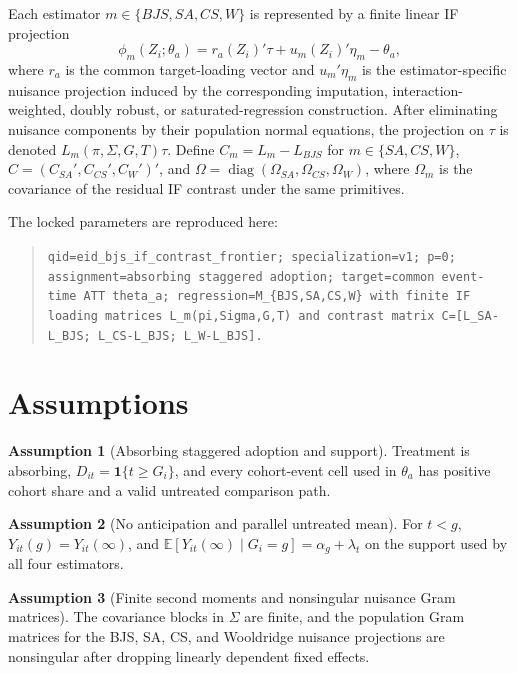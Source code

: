 \documentclass[11pt]{article}
\newcommand{\E}{\mathbb{E}}
\newcommand{\one}{\mathbf{1}}
\theoremstyle{definition}
\newtheorem{assumption}{Assumption}
\theoremstyle{plain}
\theoremstyle{remark}
\begin{document}
Each estimator $m\in\{BJS,SA,CS,W\}$ is represented by a finite linear IF projection
\[
\phi_m(Z_i;\theta_a)= r_a(Z_i)'\tau + u_m(Z_i)'\eta_m - \theta_a,
\]
where $r_a$ is the common target-loading vector and $u_m'\eta_m$ is the estimator-specific nuisance projection induced by the corresponding imputation, interaction-weighted, doubly robust, or saturated-regression construction. After eliminating nuisance components by their population normal equations, the projection on $\tau$ is denoted $L_m(\pi,\Sigma,G,T)\tau$. Define $C_m=L_m-L_{BJS}$ for $m\in\{SA,CS,W\}$, $C=(C_{SA}',C_{CS}',C_W')'$, and $\Omega=\operatorname{diag}(\Omega_{SA},\Omega_{CS},\Omega_W)$, where $\Omega_m$ is the covariance of the residual IF contrast under the same primitives.

The locked parameters are reproduced here:
\begin{quote}\small
\texttt{qid=eid\_bjs\_if\_contrast\_frontier; specialization=v1; p=0; assignment=absorbing staggered adoption; target=common event-time ATT theta\_a; regression=M\_\{BJS,SA,CS,W\} with finite IF loading matrices L\_m(pi,Sigma,G,T) and contrast matrix C=[L\_SA-L\_BJS; L\_CS-L\_BJS; L\_W-L\_BJS].}
\end{quote}

\section{Assumptions}
\begin{assumption}[Absorbing staggered adoption and support]\label{ass:support}
Treatment is absorbing, $D_{it}=\one\{t\geq G_i\}$, and every cohort-event cell used in $\theta_a$ has positive cohort share and a valid untreated comparison path.
\end{assumption}

\begin{assumption}[No anticipation and parallel untreated mean]\label{ass:parallel}
For $t<g$, $Y_{it}(g)=Y_{it}(\infty)$, and $\E[Y_{it}(\infty)\mid G_i=g]=\alpha_g+\lambda_t$ on the support used by all four estimators.
\end{assumption}

\begin{assumption}[Finite second moments and nonsingular nuisance Gram matrices]\label{ass:gram}
The covariance blocks in $\Sigma$ are finite, and the population Gram matrices for the BJS, SA, CS, and Wooldridge nuisance projections are nonsingular after dropping linearly dependent fixed effects.
\end{assumption}
\end{document}
